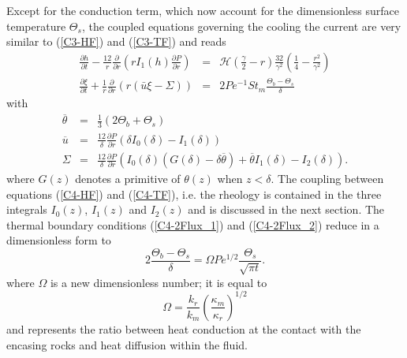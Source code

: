 Except  for   the  conduction   term,  which   now  account   for  the
dimensionless  surface temperature  $\Theta_s$, the  coupled equations
governing the  cooling the current  are very similar  to (\ref{C3-HF})
and (\ref{C3-TF}) and reads
\begin{eqnarray}
  \frac{\partial h}{\partial t}-\frac{12}{r}
  \frac{\partial}{\partial      r}
  \left( r I_1(h) \frac{\partial P}{\partial
  r}\right)
  \label{C4-HF}
  & =& \mathcal{H}(\frac{\gamma}{2}-r)\frac{32}{\gamma^{2}}\left(\frac{1}{4}-\frac{r^{2}}{\gamma^{2}}\right)\\
  \frac{\partial                                       \xi}{\partial
  t}+\frac{1}{r}\frac{\partial}{\partial                          r}
  \left( r\left(\bar{u}\xi-\Sigma\right)\right)&=&2Pe^{-1}St_m\frac{\Theta_b-\Theta_s}{\delta}\label{C4-TF}
\end{eqnarray}
with
\begin{eqnarray}
  \overline{\theta}&=&\frac{1}{3}\left(2\Theta_b+\Theta_s\right)\label{C4-tbar}\\
  \overline{u}&=&\frac{12}{\delta}
                  \frac{\partial
                  P}{\partial
                  r}\left(\delta
                  I_0(\delta)-I_1(\delta)\right)\\
  \Sigma &=& \frac{12}{\delta} \frac{\partial P}{\partial r}\left(I_0(\delta)\left(G(\delta)-\delta\overline{\theta}\right)+\overline{\theta}I_1(\delta)-I_2(\delta)\right).
\end{eqnarray}
where $G(z)$ denotes  a primitive of $\theta(z)$  when $z<\delta$. The
coupling between equations (\ref{C4-HF}) and (\ref{C4-TF}), i.e. the rheology is
contained in the  three integrals $I_0(z)$, $I_1(z)$  and $I_2(z)$ and
is discussed  in the  next section.   The thermal  boundary conditions
(\ref{C4-2Flux_1})  and (\ref{C4-2Flux_2})  reduce in  a dimensionless
form to
\begin{equation}
  2\frac{\Theta_b-\Theta_s}{\delta}               =               \Omega
  Pe^{1/2}\frac{\Theta_s}{\sqrt{\pi t}}.
  \label{C4-Boundary-Condi}
\end{equation}
where $\Omega$ is a new dimensionless number; it is equal to
\begin{equation}
  \Omega=\frac{k_r}{k_m}\left(\frac{\kappa_m}{\kappa_r}\right)^{1/2}\label{omega}
\end{equation}
and represents the  ratio between heat conduction at  the contact with
the encasing rocks and heat diffusion within the fluid.

